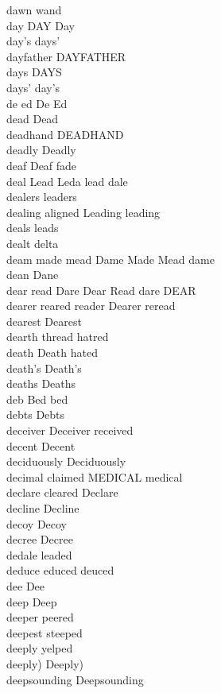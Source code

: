 dawn wand\\
day DAY Day\\
day's days'\\
dayfather DAYFATHER\\
days DAYS\\
days' day's\\
de ed De Ed\\
dead Dead\\
deadhand DEADHAND\\
deadly Deadly\\
deaf Deaf fade\\
deal Lead Leda lead dale\\
dealers leaders\\
dealing aligned Leading leading\\
deals leads\\
dealt delta\\
deam made mead Dame Made Mead dame\\
dean Dane\\
dear read Dare Dear Read dare DEAR\\
dearer reared reader Dearer reread\\
dearest Dearest\\
dearth thread hatred\\
death Death hated\\
death's Death's\\
deaths Deaths\\
deb Bed bed\\
debts Debts\\
deceiver Deceiver received\\
decent Decent\\
deciduously Deciduously\\
decimal claimed MEDICAL medical\\
declare cleared Declare\\
decline Decline\\
decoy Decoy\\
decree Decree\\
dedale leaded\\
deduce educed deuced\\
dee Dee\\
deep Deep\\
deeper peered\\
deepest steeped\\
deeply yelped\\
deeply) Deeply)\\
deepsounding Deepsounding\\
